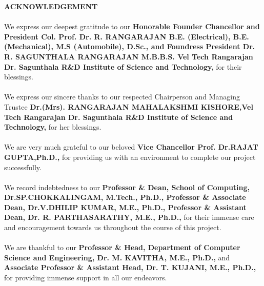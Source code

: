 \documentclass[10pt]{report}
\begin{document}
\newpage
\begin{center}
\LARGE{\textbf{ACKNOWLEDGEMENT}}\\[1cm]
\end{center}
\linespread{1.13}
\begin{sloppypar}

\large{\paragraph{}We express our deepest gratitude to our \textbf{Honorable Founder Chancellor and President
Col. Prof. Dr. R. RANGARAJAN B.E. (Electrical), B.E. (Mechanical), M.S
(Automobile), D.Sc., and Foundress President Dr. R. SAGUNTHALA RANGARAJAN
M.B.B.S. Vel Tech Rangarajan Dr. Sagunthala
R\&D Institute of Science and Technology,} for their blessings.

\large{\paragraph{}We express our sincere thanks to our respected Chairperson and Managing Trustee \textbf{Dr.(Mrs).
RANGARAJAN MAHALAKSHMI KISHORE,Vel Tech Rangarajan Dr. Sagunthala
R\&D Institute of Science and Technology,} for her blessings. 

\large{\paragraph{}We are very much grateful to our beloved \textbf{Vice Chancellor Prof. Dr.RAJAT
GUPTA,Ph.D.,} for providing us with an environment to complete our project successfully.}

\large{\paragraph{}We record indebtedness to our \textbf{Professor \& Dean, School of Computing, Dr.SP.CHOKKALINGAM, M.Tech., Ph.D., Professor \& Associate Dean,  Dr.V.DHILIP KUMAR, M.E., Ph.D., Professor \& Assistant Dean, Dr. R. PARTHASARATHY, M.E., Ph.D., }  for their immense care and encouragement
towards us throughout the course of this project.}

\large{\paragraph{}We are thankful to our \textbf{Professor \& Head, Department of Computer Science and Engineering, Dr. M. KAVITHA, M.E., Ph.D., }and \textbf{Associate Professor \& Assistant Head, Dr. T. KUJANI, M.E., Ph.D.,} for providing immense support in all our endeavors.}

}}
\end{sloppypar}
\end{document}
